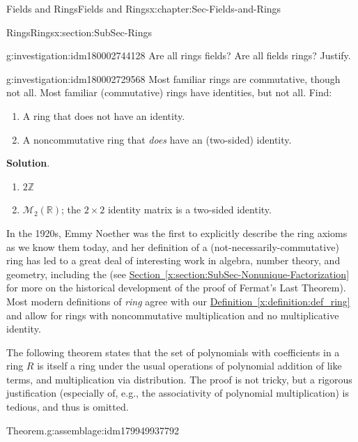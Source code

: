 \documentclass[oneside,10pt,]{book}
\newcommand{\blocktitlefont}{\relax}
\newcommand{\xreffont}{\relax}
\numberwithin{equation}{section}
\def\Z{{\mathbb Z}}
\def\R{{\mathbb R}}
\begin{document}
\begin{chapterptx}{Fields and Rings}{}{Fields and Rings}{}{}{x:chapter:Sec-Fields-and-Rings}
\begin{sectionptx}{Rings}{}{Rings}{}{}{x:section:SubSec-Rings}
\begin{investigation}{}{g:investigation:idm180002744128}%
Are all rings fields? Are all fields rings? Justify.%
\end{investigation}
\begin{investigation}{}{g:investigation:idm180002729568}%
Most familiar rings are commutative, though not all. Most familiar (commutative) rings have identities, but not all. Find:%
\begin{enumerate}
\item{}A ring that does not have an identity\footnotemark{}.%
\item{}A noncommutative ring that \emph{does} have an (two-sided) identity.%
\end{enumerate}
%
\par\smallskip%
\noindent\textbf{\blocktitlefont Solution}.\hypertarget{g:solution:idm179949923712}{}\quad{}%
\begin{enumerate}
\item{}\(2\Z\)%
\item{}\(\mathcal{M}_2(\R)\); the \(2\times 2\) identity matrix is a two-sided identity.%
\end{enumerate}
%
\end{investigation}
%
In the 1920s, Emmy Noether was the first to explicitly describe the ring axioms as we know them today, and her definition of a (not-necessarily-commutative) ring has led to a great deal of interesting work in algebra, number theory, and geometry, including the (see \hyperref[x:section:SubSec-Nonunique-Factorization]{Section~{\xreffont\ref{x:section:SubSec-Nonunique-Factorization}}} for more on the historical development of the proof of Fermat's Last Theorem). Most modern definitions of \emph{ring} agree with our \hyperref[x:definition:def_ring]{Definition~{\xreffont\ref{x:definition:def_ring}}} and allow for rings with noncommutative multiplication and no multiplicative identity.%
\par
The following theorem states that the set of polynomials with coefficients in a ring \(R\) is itself a ring under the usual operations of polynomial addition of like terms, and multiplication via distribution. The proof is not tricky, but a rigorous justification (especially of, e.g., the associativity of polynomial multiplication) is tedious, and thus is omitted.%
\begin{assemblage}{Theorem.}{g:assemblage:idm179949937792}%

\end{assemblage}
\end{sectionptx}
\end{chapterptx}
\end{document}
